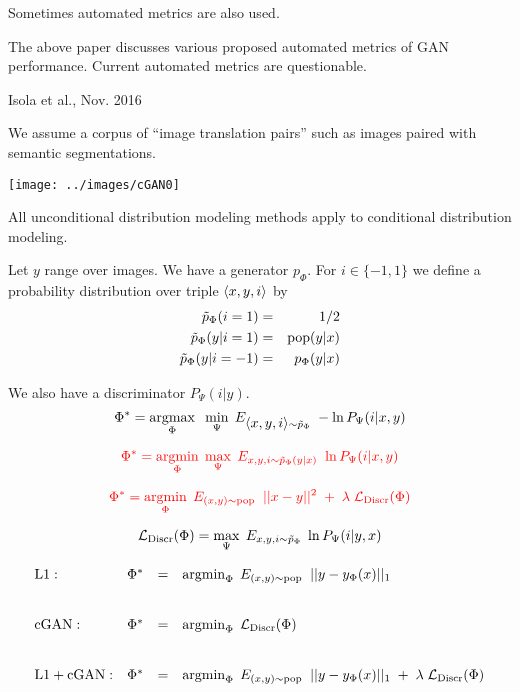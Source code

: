 {\vfill
Sometimes automated metrics are also used.

\vfill
The above paper discusses various proposed automated metrics of GAN performance.  Current automated metrics are questionable.


{Isola et al., Nov. 2016}

We assume a corpus of ``image translation pairs'' such as images paired with semantic segmentations.

\centerline{\texttt{[image: ../images/cGAN0]}}

All unconditional distribution modeling methods apply to conditional distribution modeling.
\vfill

Let $y$ range over images.  We have a generator $p_\Phi$. For $i \in \{-1,1\}$ we define a probability distribution over triple
${\mbox{$\langle x,y,i\rangle$}}$ by
\begin{eqnarray*}
\tilde{p}_\Phi(i = 1) & = & 1/2 \\
\tilde{p}_\Phi(y|i=1) & =&  \mathrm{pop}(y|x) \\
\tilde{p}_\Phi(y|i=-1) & = & p_\Phi(y|x)
\end{eqnarray*}

\vfill
We also have a discriminator $P_\Psi(i|y)$.
{\color{red} $$\Phi^* = \operatorname*{argmax}_\Phi\;\;\min_\Psi\;E_{{\mbox{$\langle x,y,i\rangle$}} \sim \tilde{p}_\Phi}\;-\ln P_\Psi(i|x,y)$$}


$${\color{red} \Phi^* = \operatorname*{argmin}_\Phi \; \max_\Psi \;E_{x,y,i \sim \tilde{p}_\Phi(y|x)}\;\;
  {\ln P_\Psi(i|x,y)}}$$


$${\color{red} \Phi^* = \operatorname*{argmin}_\Phi\;E_{(x,y) \sim \mathrm{pop}}\;\; ||x - y||^2\; + \; \lambda\; {\cal L}_{\mathrm{Discr}}(\Phi)}$$

\vfill
$${\cal L}_\mathrm{Discr}(\Phi) = \max_\Psi \;E_{x,y,i \sim \tilde{p}_\Phi}\; \ln P_\Psi(i|y,x)$$


{\huge
$$\begin{array}{lrcl}
\mathrm{L1:} & \Phi^* & = & \operatorname*{argmin}_\Phi\;E_{(x,y) \sim \mathrm{pop}}\;\; ||y - y_\Phi(x)||_1 \\
\\
\\
\mathrm{cGAN:} & \Phi^* & = & \operatorname*{argmin}_\Phi\;{\cal L}_{\mathrm{Discr}}(\Phi) \\
\\
\\
\mathrm{L1 + cGAN:} & \Phi^* & = & \operatorname*{argmin}_\Phi\;E_{(x,y) \sim \mathrm{pop}}\;\; ||y - y_\Phi(x)||_1\; +\; \lambda\; {\cal L}_\mathrm{Discr}(\Phi)
\end{array}$$
}


}
